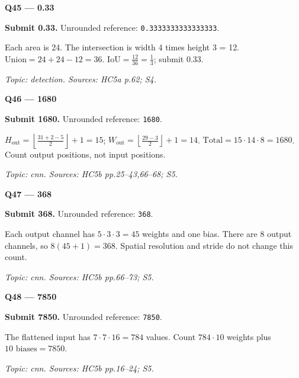 \documentclass[11pt,a4paper]{article}
\begin{document}
\par\vspace{12pt}
\begin{minipage}{\linewidth}
\textbf{Q45 — 0.33}\par\smallskip
\textbf{Submit 0.33.} Unrounded reference: \texttt{0.3333333333333333}.\par
Each area is 24. The intersection is width 4 times height 3 =\allowbreak{} 12. \(\text{Union}=24+24-12=36\). \(\mathrm{IoU}=\frac{12}{36}=\frac{1}{3}\); submit 0.33.\par
{\small\itshape Topic: detection. Sources: HC5a p.62; S4.}

\end{minipage}
\par\vspace{12pt}
\begin{minipage}{\linewidth}
\textbf{Q46 — 1680}\par\smallskip
\textbf{Submit 1680.} Unrounded reference: \texttt{1680}.\par
\(H_{\mathrm{out}}=\left\lfloor\frac{31+2-5}{2}\right\rfloor+1=15\); \(W_{\mathrm{out}}=\left\lfloor\frac{29-3}{2}\right\rfloor+1=14\). \(\text{Total}=15\cdot14\cdot8=1680\). Count output positions,\allowbreak{} not input positions.\par
{\small\itshape Topic: cnn. Sources: HC5b pp.25–43,\allowbreak{}66–68; S5.}

\end{minipage}
\par\vspace{12pt}
\begin{minipage}{\linewidth}
\textbf{Q47 — 368}\par\smallskip
\textbf{Submit 368.} Unrounded reference: \texttt{368}.\par
Each output channel has \(5\cdot3\cdot3=45\) weights and one bias. There are 8 output channels,\allowbreak{} so \(8(45+1)=368\). Spatial resolution and stride do not change this count.\par
{\small\itshape Topic: cnn. Sources: HC5b pp.66–73; S5.}

\end{minipage}
\par\vspace{12pt}
\begin{minipage}{\linewidth}
\textbf{Q48 — 7850}\par\smallskip
\textbf{Submit 7850.} Unrounded reference: \texttt{7850}.\par
The flattened input has \(7\cdot7\cdot16=784\) values. Count \(784\cdot10\) weights plus \(10\text{ biases}=7850\).\par
{\small\itshape Topic: cnn. Sources: HC5b pp.16–24; S5.}

\end{minipage}
\end{document}
